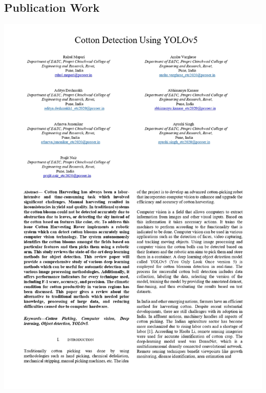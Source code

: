 \documentclass[12pt,a4paper]{report}
\begin{document}
\subsection {Publication Work}
\includegraphics[scale =0.7]{images/copyright/publication/Publication/Publication_page-0001.jpg}
\newpage
\end{document}

